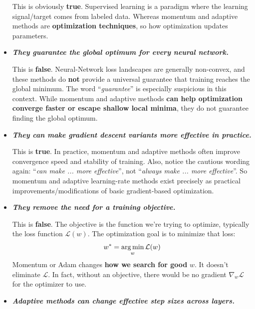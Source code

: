 \begin{itemize}
        This is obviously \textbf{true}. Supervised learning is a paradigm where the learning signal/target comes from labeled data. Whereas momentum and adaptive methods are \textbf{optimization techniques}, so how optimization updates parameters.

        \newpage

    \item[\textcolor{Red2}{\faIcon{times}}] \textcolor{Red2}{\textbf{\emph{They guarantee the global optimum for every neural network.}}}

        This is \textbf{false}. Neural-Network loss landscapes are generally non-convex, and these methods do \textbf{not} provide a universal guarantee that training reaches the global minimum. The word ``\emph{guarantee}'' is especially suspicious in this context. While momentum and adaptive methods \textbf{can help optimization converge faster or escape shallow local minima}, they do not guarantee finding the global optimum.

    \item[\textcolor{Green3}{\faIcon{check}}] \textcolor{Green3}{\textbf{\emph{They can make gradient descent variants more effective in practice.}}}

        This is \textbf{true}. In practice, momentum and adaptive methods often improve convergence speed and stability of training. Also, notice the cautious wording again: ``\emph{can make ... more effective}'', not ``\emph{always make ... more effective}''. So momentum and adaptive learning-rate methods exist precisely as practical improvements/modifications of basic gradient-based optimization.

    \item[\textcolor{Red2}{\faIcon{times}}] \textcolor{Red2}{\textbf{\emph{They remove the need for a training objective.}}}

        This is \textbf{false}. The objective is the function we're trying to optimize, typically the loss function $\mathcal{L}(w)$. The optimization goal is to minimize that loss:
        \begin{equation*}
            w^{*} = \operatorname*{arg\,min}_{w} \mathcal{L}(w)
        \end{equation*}
        Momentum or Adam changes \textbf{how we search for good} $w$. It doesn't eliminate $\mathcal{L}$. In fact, without an objective, there would be no gradient $\nabla_{w} \mathcal{L}$ for the optimizer to use.

    \item[\textcolor{Green3}{\faIcon{check}}] \textcolor{Green3}{\textbf{\emph{Adaptive methods can change effective step sizes across layers.}}}


\end{itemize}
